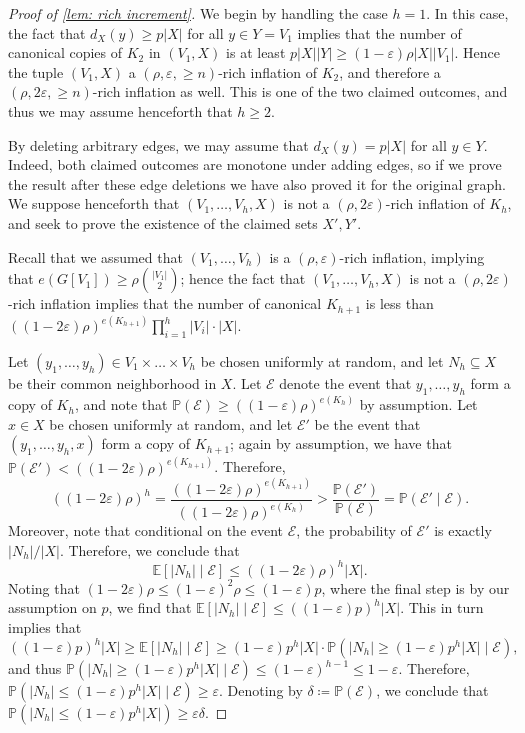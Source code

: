 \documentclass{aic}
\theoremstyle{plain}
\theoremstyle{remark}
\def\E{\mathbb{E}}
\def\EE{\mathcal{E}}
\newcommand{\eps}{\ensuremath{\varepsilon}}
\newcommand\ab[1]{\lvert #1 \rvert}
\renewcommand{\P}{\mathbb{P}}
\begin{document}
\begin{proof}[Proof of \cref{lem: rich increment}]


    We begin by handling the case $h=1$. In this case, the fact that $d_X(y) \geq p \ab X$ for all $y \in Y=V_1$ implies that the number of canonical copies of $K_2$ in $(V_1,X)$ is at least $p \ab X \ab Y \geq (1-\eps)\rho \ab X \ab {V_1}$. Hence the tuple $(V_1,X)$ a $(\rho,\eps,\geq n)$-rich inflation of $K_2$, and therefore a $(\rho,2\eps,\geq n)$-rich inflation as well. This is one of the two claimed outcomes, and thus we may assume henceforth that $h \geq 2$.

By deleting arbitrary edges, we may assume that $d_X(y) = p|X|$ for all $y \in Y$. Indeed, both claimed outcomes are monotone under adding edges, so if we prove the result after these edge deletions we have also proved it for the original graph. 
We suppose henceforth that $(V_1,\dots,V_h,X)$ is not a $(\rho,2\eps)$-rich inflation of $K_h$, and seek to prove the existence of the claimed sets $X',Y'$.
    
Recall that we assumed that $(V_1,\dots,V_h)$ is a $(\rho,\eps)$-rich inflation, implying that $e(G[V_1]) \geq \rho \binom{\ab{V_1}}2$; hence the fact that $(V_1,\dots,V_h,X)$ is not a $(\rho,2\eps)$-rich inflation implies that the number of canonical $K_{h+1}$ is less than $((1-2\eps)\rho)^{e(K_{h+1})} \prod_{i=1}^h \ab{V_i}\cdot \ab X$.


Let $(y_1,\dots,y_h)\in V_1\times \dots \times V_h$ be chosen uniformly at random, and let $N_h \subseteq X$ be their common neighborhood in $X$.
Let $\EE$ denote the event that $y_1,\dots,y_h$ form a copy of $K_h$, and note that $\P(\EE) \geq ((1-\eps)\rho)^{e(K_h)}$ by assumption. 
Let $x \in X$ be chosen uniformly at random, and let $\EE'$ be the event that $(y_1,\dots,y_h,x)$ form a copy of $K_{h+1}$; again by assumption, we have that $\P(\EE')<((1-2\eps)\rho)^{e(K_{h+1})}$. Therefore,
\[
((1-2\eps)\rho)^h = \frac{((1-2\eps)\rho)^{e(K_{h+1})}}{((1-2\eps)\rho)^{e(K_h)}} > \frac{\P(\EE')}{\P(\EE)} = \P(\EE' \mid \EE).
\]
Moreover, note that conditional on the event $\EE$, the probability of $\EE'$ is exactly $\ab{N_h}/\ab X$. Therefore, we conclude that
\[
\E[\ab{N_h} \mid \EE] \leq ((1-2\eps)\rho)^{h}\ab X.
\]
Noting that $(1-2\eps)\rho \leq (1-\eps)^2\rho \leq (1-\eps)p$, where the final step is by our assumption on $p$, we find that $\E[\ab{N_h} \mid \EE] \leq ((1-\eps)p)^h \ab X$. This in turn implies that
\[
((1-\eps)p)^h \ab X \geq \E[\ab{N_h} \mid \EE] \geq (1-\eps)p^h \ab X\cdot \P(\ab{N_h} \geq (1-\eps)p^h \ab X\mid \EE),
\]
and thus $\P(\ab{N_h} \geq (1-\eps)p^h \ab X \mid \EE) \leq (1-\eps)^{h-1} \leq 1-\eps$. Therefore, $\P(\ab{N_h} \leq (1-\eps)p^h \ab X \mid \EE) \geq \eps$. Denoting by $\delta \coloneqq \P(\EE)$, we conclude that
$\P(|N_h|\leq (1-\eps)p^h|X|)\ge \eps \delta$. 


\end{proof}
\end{document}
